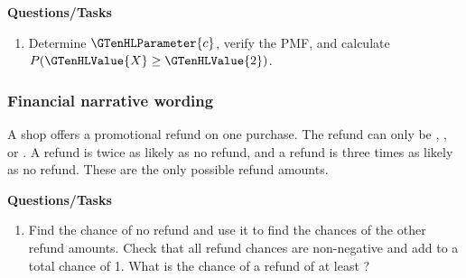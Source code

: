 \textbf{Questions/Tasks}
\begin{enumerate}
\item Determine $\GTenHLParameter{c}$, verify the PMF, and calculate $P(\GTenHLValue{X}\geq\GTenHLValue{2})$.
\end{enumerate}
\subsubsection*{Financial narrative wording}
A shop offers a promotional refund on one purchase. The refund can only be , , or . A  refund is twice as likely as no refund, and a  refund is three times as likely as no refund. These are the only possible refund amounts.

\textbf{Questions/Tasks}
\begin{enumerate}
\item Find the chance of no refund and use it to find the chances of the other refund amounts. Check that all refund chances are non-negative and add to a total chance of 1. What is the chance of a refund of at least ?
\end{enumerate}
